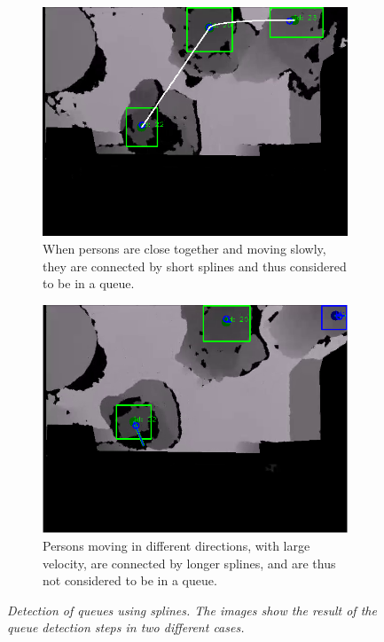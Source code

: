 \begin{figure}[H]
\centering
\begin{subfigure}{.5\textwidth}
  \centering
  \includegraphics[width=0.9\linewidth]{images/visibleQueue.png}
  \caption{When persons are close together and moving slowly, \\
  			 they are connected by short splines and thus considered\\
  			  to be in a queue.}
  \label{fig:visible_queue}
\end{subfigure}%
\begin{subfigure}{.5\textwidth}
  \centering
  \includegraphics[width=0.9\linewidth]{images/noQueue.png}
  \caption{Persons moving in different directions, with large velocity, are connected by longer splines, and are thus not considered to be in a queue.}
  \label{fig:no_queue}
\end{subfigure}
\caption[Queue detection]{\textit{Detection of queues using splines. The images show the result of the queue detection steps in two different cases.}}
\label{fig:queue_detection}
\end{figure}



